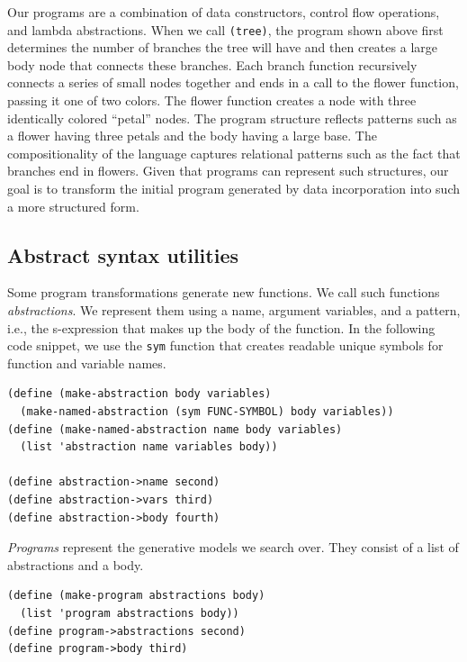 \documentclass[a4paper,10pt]{article}
\begin{document}
Our programs are a combination of data constructors, control flow operations, and lambda abstractions.  When we call \texttt{(tree)}, the program shown above first determines the number of branches the tree will have and then creates a large body node that connects these branches.  Each branch function recursively connects a series of small nodes together and ends in a call to the flower function, passing it one of two colors.  The flower function creates a node with three identically colored ``petal'' nodes.  The program structure reflects patterns such as a flower having three petals and the body having a large base.  The compositionality of the language captures relational patterns such as the fact that branches end in flowers. Given that programs can represent such structures, our goal is to transform the initial program generated by data incorporation into such a more structured form.

\subsection{Abstract syntax utilities}
Some program transformations generate new functions. We call such functions {\em abstractions}. We represent them using a name, argument variables, and a pattern, i.e., the s-expression that makes up the body of the function. In the following code snippet, we use the \texttt{sym} function that creates readable unique symbols for function and variable names.
\begin{lstlisting}[frame=trbl]
(define (make-abstraction body variables)
  (make-named-abstraction (sym FUNC-SYMBOL) body variables))
(define (make-named-abstraction name body variables)
  (list 'abstraction name variables body))

(define abstraction->name second)
(define abstraction->vars third)
(define abstraction->body fourth)
\end{lstlisting}

{\em Programs} represent the generative models we search over. They consist of a list of abstractions and a body.
\begin{lstlisting}[frame=trbl]
(define (make-program abstractions body)
  (list 'program abstractions body))
(define program->abstractions second)
(define program->body third)
\end{lstlisting}  
\end{document}
